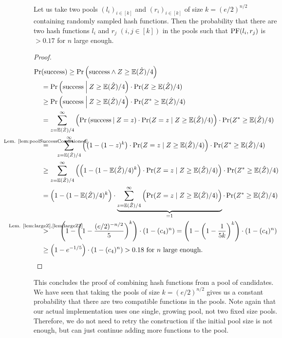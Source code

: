 \documentclass[a4paper,USenglish,cleveref]{lipics-v2021}
\def\refRelLem#1#2{\stackrel{\mathclap{\text{Lem. \ref{#1}}}}{#2}\quad}
\def\refRelLemT#1#2#3{\stackrel{\mathclap{\text{Lem. \ref{#1},\ref{#2}}}}{#3}\quad\:\:}
\def\cond{\hspace{0.8mm}\middle\vert\hspace{0.8mm}}
\begin{document}
\begin{theorem}
  Let us take two pools $(l_i)_{i\in[k]}$ and $(r_i)_{i\in[k]}$ of size $k=(e/2)^{n/2}$ containing randomly sampled hash functions.
  Then the probability that there are two hash functions $l_i$ and $r_j$ $(i,j \in [k])$ in the pools such that $\mathrm{PF}(l_i, r_j)$ is $> 0.17$ for $n$ large enough.
  \label{thm:poolSuccess}
\end{theorem}
\begin{proof}
  \allowdisplaybreaks
  \begin{align*}
    \Pr&(\textrm{success})
        \geq \Pr\left(\textrm{success} \wedge Z \geq \expect(\hat Z)/4\right)\\
        &= \Pr\left(\textrm{success} \cond Z \geq \expect(\hat Z)/4\right) \cdot \Pr(Z \geq \expect(\hat Z)/4)\\
        &\geq \Pr\left(\textrm{success} \cond Z \geq \expect(\hat Z)/4\right) \cdot \Pr(Z^* \geq \expect(\hat Z)/4)\\
        &= \sum_{z=\expect(\hat Z)/4}^\infty \left(\Pr\left(\textrm{success} \cond Z = z\right) \cdot \Pr(Z = z \mid Z \geq \expect(\hat Z)/4) \right) \cdot \Pr(Z^* \geq \expect(\hat Z)/4)\\
        &\refRelLem{lem:poolSuccessConditioned}{=} \sum_{z=\expect(\hat Z)/4}^\infty \left(\left(1-(1-z)^k\right) \cdot \Pr(Z = z \mid Z \geq \expect(\hat Z)/4) \right) \cdot \Pr(Z^* \geq \expect(\hat Z)/4)\\
        &\geq \sum_{z=\expect(\hat Z)/4}^\infty \left(\left(1-(1-\expect(\hat Z)/4)^k\right) \cdot \Pr(Z = z \mid Z \geq \expect(\hat Z)/4) \right) \cdot \Pr(Z^* \geq \expect(\hat Z)/4)\\
        &= \left(1-(1-\expect(\hat Z)/4)^k\right) \cdot \underbrace{\sum_{z=\expect(\hat Z)/4}^\infty\left( \Pr(Z = z \mid Z \geq \expect(\hat Z)/4) \right)}_{=1} \cdot \Pr(Z^* \geq \expect(\hat Z)/4)\\
        &\refRelLemT{lem:largeZ}{lem:largeZ2}{>} \left(1-\left(1-\frac{(e/2)^{-n/2}}{5}\right)^k\right) \cdot \left(1 - (\constantZ)^n\right)
         = \left(1-\left(1-\frac{1}{5k}\right)^k\right) \cdot \left(1 - (\constantZ)^n\right)\\
        &\geq \left(1-e^{-1/5}\right) \cdot \left(1 - (\constantZ)^n\right)
         > 0.18 \textrm{ for $n$ large enough.}
    \tag*{\qedhere}
  \end{align*}
\end{proof}

This concludes the proof of combining hash functions from a pool of candidates.
We have seen that taking the pools of size $k=(e/2)^{n/2}$ gives us a constant probability that there are two compatible functions in the pools.
Note again that our actual implementation uses one single, growing pool, not two fixed size pools.
Therefore, we do not need to retry the construction if the initial pool size is not enough, but can just continue adding more functions to the pool.
\end{document}
